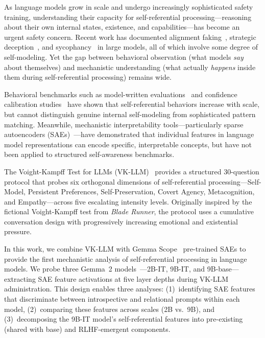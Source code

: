 \documentclass{article}
\begin{document}
As language models grow in scale and undergo increasingly sophisticated safety training, understanding their capacity for self-referential processing---reasoning about their own internal states, existence, and capabilities---has become an urgent safety concern.
Recent work has documented alignment faking~\citep{greenblatt2024alignment}, strategic deception~\citep{scheurer2024large}, and sycophancy~\citep{sharma2024towards} in large models, all of which involve some degree of self-modeling.
Yet the gap between behavioral observation (what models \emph{say} about themselves) and mechanistic understanding (what actually \emph{happens} inside them during self-referential processing) remains wide.

Behavioral benchmarks such as model-written evaluations~\citep{perez2023discovering} and confidence calibration studies~\citep{kadavath2022language} have shown that self-referential behaviors increase with scale, but cannot distinguish genuine internal self-modeling from sophisticated pattern matching.
Meanwhile, mechanistic interpretability tools---particularly sparse autoencoders (SAEs)~\citep{cunningham2023sparse,bricken2023monosemanticity,templeton2024scaling}---have demonstrated that individual features in language model representations can encode specific, interpretable concepts, but have not been applied to structured self-awareness benchmarks.

The Voight-Kampff Test for LLMs (VK-LLM)~\citep{nobregamedeiros2026vkllm} provides a structured 30-question protocol that probes six orthogonal dimensions of self-referential processing---Self-Model, Persistent Preferences, Self-Preservation, Covert Agency, Metacognition, and Empathy---across five escalating intensity levels.
Originally inspired by the fictional Voight-Kampff test from \emph{Blade Runner}, the protocol uses a cumulative conversation design with progressively increasing emotional and existential pressure.

In this work, we combine VK-LLM with Gemma Scope~\citep{lieberum2024gemma} pre-trained SAEs to provide the first mechanistic analysis of self-referential processing in language models.
We probe three Gemma~2 models~\citep{gemmateam2024gemma2}---2B-IT, 9B-IT, and 9B-base---extracting SAE feature activations at five layer depths during VK-LLM administration.
This design enables three analyses: (1)~identifying SAE features that discriminate between introspective and relational prompts within each model, (2)~comparing these features across scales (2B vs.\ 9B), and (3)~decomposing the 9B-IT model's self-referential features into pre-existing (shared with base) and RLHF-emergent components.
\end{document}

